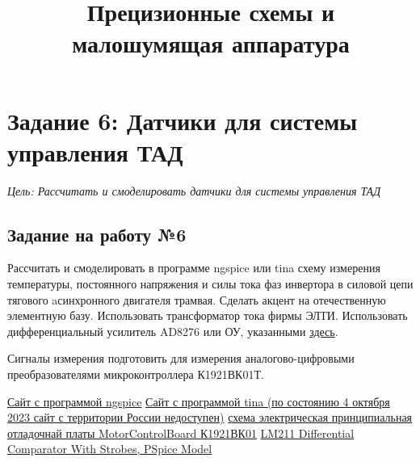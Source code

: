 \title{Прецизионные схемы и малошумящая аппаратура}
\author{}


\section{Задание 6: Датчики для системы управления ТАД}

{\it Цель: Рассчитать и смоделировать датчики для системы управления ТАД} 


 
\subsection{Задание на работу №6}

Рассчитать и смоделировать в программе ngspice или tina схему измерения температуры, постоянного напряжения и силы тока фаз инвертора в силовой цепи тягового aсинхронного двигателя трамвая. 
Сделать акцент на отечественную элементную базу.
Использовать трансформатор тока фирмы ЭЛТИ.
Использовать дифференциальный усилитель AD8276 или ОУ, указанными \href{http://motorcontrol.ru/wp-content/uploads/2019/08/MCB2.pdf}{здесь}.

Сигналы измерения подготовить для измерения аналогово-цифровыми преобразователями микроконтроллера К1921ВК01Т.




\renewcommand{\bibname}{}
\begin{thebibliography}{1}
         \href{https://ngspice.sourceforge.io/}{Сайт с программой ngspice}
         \href{https://www.ti.com/tool/TINA-TI}{Сайт с программой tina (по состоянию 4 октября 2023 сайт с территории России недоступен)}
         \href{http://motorcontrol.ru/wp-content/uploads/2019/08/MCB2.pdf}{схема электрическая принципиальная отладочнай платы MotorControlBoard К1921ВК01}
         \href{https://www.ti.com/product/LM211}{LM211 Differential Comparator With Strobes, PSpice Model}

\end{thebibliography}







